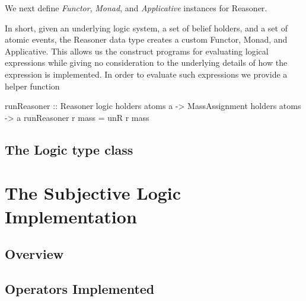 \documentclass[a4paper]{report}
\begin{document}
\par
We next define \emph{Functor}, \emph{Monad}, and \emph{Applicative} instances for
Reasoner.


\par
In short, given an underlying logic system, a set of belief holders, and a set of
atomic events, the Reasoner data type creates a custom Functor, Monad, and Applicative.
This allows us the construct programs for evaluating logical expressions while giving no
consideration to the underlying details of how the expression is implemented. In order
to evaluate such expressions we provide a helper function

\begin{code}
  runReasoner :: Reasoner logic holders atoms a
              -> MassAssignment holders atoms
              -> a
  runReasoner r mass = unR r mass
\end{code}





\subsection{The Logic type class}



\section{The Subjective Logic Implementation}

\subsection{Overview}

\subsection{Operators Implemented}
\end{document}
